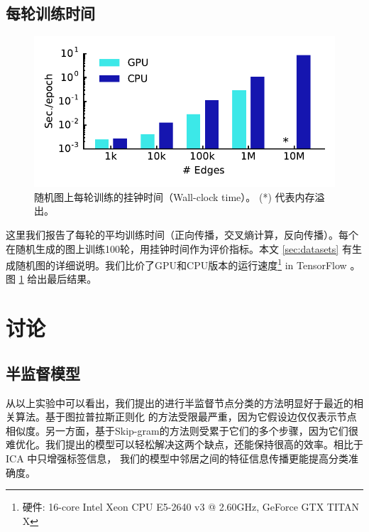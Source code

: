 \documentclass{article} %
\makeatletter
\newcommand*{\registered}{{\ooalign{\hfil\raise .00ex\hbox{\scriptsize R}\hfil\crcr\mathhexbox20D}}\@\xspace}
\makeatother
\begin{document}
\newpage
\subsection{每轮训练时间}
\begin{figure}
\vspace{-3em}
    \centering
    \includegraphics[scale=0.56, trim={0.45cm 0.45cm 0.45cm 0}, clip]{time_per_epoch}
    \caption{随机图上每轮训练的挂钟时间（Wall-clock time）。 (*) 代表内存溢出。}
    \label{fig:epoch_timing}
    \vspace{-1em}
\end{figure}

这里我们报告了每轮的平均训练时间（正向传播，交叉熵计算，反向传播）。每个在随机生成的图上训练100轮，用挂钟时间作为评价指标。本文 \ref{sec:datasets} 有生成随机图的详细说明。我们比价了GPU和CPU版本的运行速度\footnote{硬件: 16-core Intel\registered Xeon\registered CPU E5-2640 v3 @ 2.60GHz, GeForce\registered GTX TITAN X} in TensorFlow \citep{tensorflow2015-whitepaper}。 图 \ref{fig:epoch_timing} 给出最后结果。

\section{讨论}

\subsection{半监督模型}
从以上实验中可以看出，我们提出的进行半监督节点分类的方法明显好于最近的相关算法。基于图拉普拉斯正则化 \citep{zhu2003semi, belkin2006manifold, weston2012deep} 的方法受限最严重，因为它假设边仅仅表示节点相似度。另一方面，基于Skip-gram的方法则受累于它们的多个步骤，因为它们很难优化。我们提出的模型可以轻松解决这两个缺点，还能保持很高的效率。相比于ICA \citep{lu2003link}中只增强标签信息， 我们的模型中邻居之间的特征信息传播更能提高分类准确度。
\end{document}
